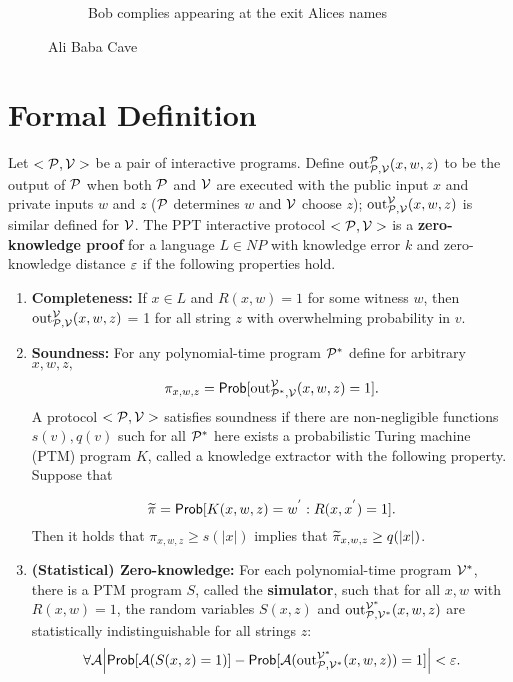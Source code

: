 \begin{figure}[t!]
\begin{subfigure}[t]{0.30\textwidth}
{\begin{tikzpicture}[scale=1]
      \end{tikzpicture}
    }
    \caption{Bob complies appearing at the exit Alices names}
    \label{fig:alibaba:c}
  \end{subfigure}
  \caption{Ali Baba Cave}
  \label{fig:alibaba}
\end{figure}

\section{Formal Definition~\cite{kiagias:crypto}}

Let $<\calp, \calv>$ be a pair of interactive programs. Define $\text{out}^{\calp}_{\calp, \calv}(x,w,z)$
to be the output of $\calp$ when both $\calp$ and $\calv$ are executed with the public input $x$ and private
inputs $w$ and $z$ ($\calp$ determines $w$ and $\calv$ choose $z$); $\text{out}^{\calv}_{\calp, \calv}(x,w,z)$
is similar defined for $\calv$. The PPT interactive protocol $<\calp, \calv>$ is a \textbf{zero-knowledge proof}
for a language $L \in NP$ with knowledge error $k$ and zero-knowledge distance $\e$ if the following
properties hold.

\begin{enumerate}
  \item \textbf{Completeness:} If $x \in L$ and $R(x,w) = 1$ for some witness $w$, then $\text{out}^{\calv}_{\calp, \calv}(x,w,z)$ = 1
    for all string $z$ with overwhelming probability in $v$.
  \item \textbf{Soundness:} For any polynomial-time program $\calp^{*}$ define for arbitrary $x,w,z,$
    \begin{equation*}
      \pi_{x,w,z} = \Prob[\text{out}^{\calv}_{\calp^{*}, \calv}(x,w,z) = 1].
    \end{equation*}
    A protocol $<\calp, \calv>$ satisfies soundness if there are non-negligible functions $s(v), q(v)$ such for all $\calp^{*}$ here exists a probabilistic
    Turing machine (PTM) program $K$, called a knowledge extractor with the following property. Suppose that

    \begin{equation*}
      \widetilde{\pi} = \Prob[K(x,w,z) = w^{'} : R(x, x^{'}) = 1].
    \end{equation*}
    Then it holds that $\pi_{x,w,z} \geq s(|x|)$ implies that $\widetilde{\pi}_{x,w,z} \geq q(\abs{x})$.

  \item \textbf{(Statistical) Zero-knowledge:} For each polynomial-time program $\calv^{*}$, there is a PTM program $S$, called the \textbf{simulator}, such that for all
    $x,w$ with $R(x,w) = 1$, the random variables $S(x,z)$ and $\text{out}^{\calv^{*}}_{\calp, \calv^{*}}(x,w,z)$ are statistically indistinguishable for all strings $z$:
    \begin{equation*}
      \forall \cala \abs[\Big]{\Prob[\cala(S(x,z) = 1)] - \Prob[\cala(\text{out}^{\calv^{*}}_{\calp, \calv^{*}}(x,w,z)) = 1]} < \e.
    \end{equation*}
\end{enumerate}

